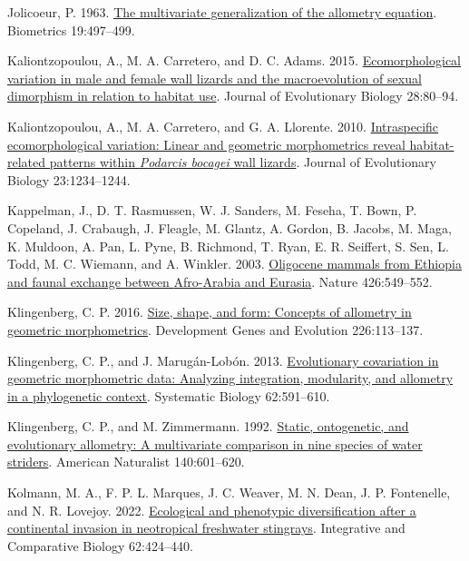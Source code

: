 \documentclass[
  11pt,
]{article}
\newlength{\cslhangindent}
\newlength{\cslentryspacingunit} %
\newenvironment{CSLReferences}[2] %
 {%
  \setlength{\parindent}{0pt}
  \ifodd #1
  \let\oldpar\par
  \def\par{\hangindent=\cslhangindent\oldpar}
  \fi
  \setlength{\parskip}{#2\cslentryspacingunit}
 }%
 {}
\begin{document}
\begin{CSLReferences}{1}{0}
\leavevmode{}%
Jolicoeur, P. 1963. \href{https://doi.org/10.2307/2527939}{The
multivariate generalization of the allometry equation}. Biometrics
19:497--499.

\leavevmode{}%
Kaliontzopoulou, A., M. A. Carretero, and D. C. Adams. 2015.
\href{https://doi.org/10.1111/jeb.12540}{Ecomorphological variation in
male and female wall lizards and the macroevolution of sexual dimorphism
in relation to habitat use}. Journal of Evolutionary Biology 28:80--94.

\leavevmode{}%
Kaliontzopoulou, A., M. A. Carretero, and G. A. Llorente. 2010.
\href{https://doi.org/10.1111/j.1420-9101.2010.01984.x}{Intraspecific
ecomorphological variation: Linear and geometric morphometrics reveal
habitat-related patterns within \emph{{P}odarcis bocagei} wall lizards}.
Journal of Evolutionary Biology 23:1234--1244.

\leavevmode{}%
Kappelman, J., D. T. Rasmussen, W. J. Sanders, M. Feseha, T. Bown, P.
Copeland, J. Crabaugh, J. Fleagle, M. Glantz, A. Gordon, B. Jacobs, M.
Maga, K. Muldoon, A. Pan, L. Pyne, B. Richmond, T. Ryan, E. R. Seiffert,
S. Sen, L. Todd, M. C. Wiemann, and A. Winkler. 2003.
\href{https://doi.org/10.1038/nature02102}{Oligocene mammals from
{Ethiopia} and faunal exchange between {Afro}-{Arabia} and {Eurasia}}.
Nature 426:549--552.

\leavevmode{}%
Klingenberg, C. P. 2016.
\href{https://doi.org/10.1007/s00427-016-0539-2}{Size, shape, and form:
Concepts of allometry in geometric morphometrics}. Development Genes and
Evolution 226:113--137.

\leavevmode{}%
Klingenberg, C. P., and J. Marugán-Lobón. 2013.
\href{https://doi.org/10.1093/sysbio/syt025}{Evolutionary covariation in
geometric morphometric data: Analyzing integration, modularity, and
allometry in a phylogenetic context}. Systematic Biology 62:591--610.

\leavevmode{}%
Klingenberg, C. P., and M. Zimmermann. 1992.
\href{https://doi.org/10.1086/285430}{Static, ontogenetic, and
evolutionary allometry: A multivariate comparison in nine species of
water striders}. American Naturalist 140:601--620.

\leavevmode{}%
Kolmann, M. A., F. P. L. Marques, J. C. Weaver, M. N. Dean, J. P.
Fontenelle, and N. R. Lovejoy. 2022.
\href{https://doi.org/10.1093/icb/icac019}{Ecological and phenotypic
diversification after a continental invasion in neotropical freshwater
stingrays}. Integrative and Comparative Biology 62:424--440.


\end{CSLReferences}
\end{document}
